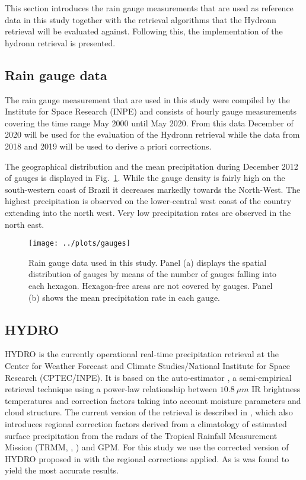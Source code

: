 \documentclass[journal abbreviation, manuscript]{copernicus}
\begin{document}
This section introduces the rain gauge measurements that are used as reference
data in this study together with the retrieval algorithms that the Hydronn
retrieval will be evaluated against. Following this, the implementation of the
hydronn retrieval is presented.

\subsection{Rain gauge data}

The rain gauge measurement that are used in this study were compiled by the
Institute for Space Research (INPE) and consists of hourly gauge measurements
covering the time range May 2000 until May 2020. From this data December of
2020 will be used for the evaluation of the Hydronn retrieval while the data
from 2018 and 2019 will be used to derive a priori corrections.

The geographical distribution and the mean precipitation during December 2012 of
gauges is displayed in Fig.~\ref{fig:gauges}. While the gauge density is fairly
high on the south-western coast of Brazil it decreases markedly towards the
North-West. The highest precipitation is observed on the lower-central west
coast of the country extending into the north west. Very low precipitation rates
are observed in the north east.

\begin{figure}
  \centering
  \texttt{[image: ../plots/gauges]}
  \caption{
    Rain gauge data used in this study. Panel (a) displays the spatial
    distribution of gauges by means of the number of gauges falling into
    each hexagon. Hexagon-free areas are not covered by gauges. Panel (b)
    shows the mean precipitation rate in each gauge.
    }
  \label{fig:gauges}
\end{figure}
    

\subsection{HYDRO}

HYDRO is the currently operational real-time precipitation retrieval at the
Center for Weather Forecast and Climate Studies/National Institute for Space
Research (CPTEC/INPE). It is based on the auto-estimator \citep{vicente98}, a
semi-empirical retrieval technique using a power-law relationship between
$10.8\ \unit{\mu m}$ IR brightness temperatures and correction factors taking
into account moisture parameters and cloud structure. The current version of the
retrieval is described in \citet{siqueira19}, which also introduces regional
correction factors derived from a climatology of estimated surface precipitation
from the radars of the Tropical Rainfall Measurement Mission (TRMM,
\citeauthor{simpson96}, \citeyear{simpson96}) and GPM. For this study we use the
corrected version of HYDRO proposed in \citet{siqueira19} with the regional
corrections applied. As is was found to yield the most accurate results.
\end{document}
